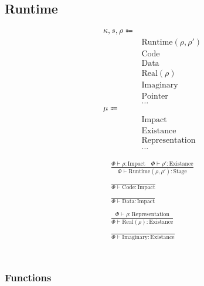 \documentclass {article}
\begin{document}
\subsection{Runtime}

\begin{align*}
\kappa, s, \rho \Coloneqq & \\
& \text{Runtime} (\rho, \rho') \tag{Runtime Stage}\\
& \text{Code} \tag{Code Impact}\\
& \text{Data} \tag{Data Impact}\\
& \text{Real} (\rho) \tag{Real Existance} \\
& \text{Imaginary} \tag{Imaginary Existance} \\
& \text{Pointer} \tag{Pointer Representation}\\
& \dots \\
\mu \Coloneqq & \\
& \text{Impact} \\
& \text{Existance} \\
& \text{Representation} \\
& \dots
\end{align*}

\begin{gather*}
\frac
{\Phi \vdash \rho : \text{Impact} \quad \Phi \vdash \rho' : \text{Existance}}
{\Phi \vdash \text{Runtime} (\rho, \rho') : \text{Stage}} \\
\\
\frac
{}
{\Phi \vdash \text{Code} : \text{Impact}} \\
\\
\frac
{}
{\Phi \vdash \text{Data} : \text{Impact}} \\
\\
\frac
{\Phi \vdash \rho : \text{Representation}}
{\Phi \vdash \text{Real} (\rho) : \text{Existance}} \\
\\
\frac
{}
{\Phi \vdash \text{Imaginary} : \text{Existance}} \\
\end{gather*}

\begin{gather*}
\end{gather*}

\subsubsection{Functions}
\end{document}
